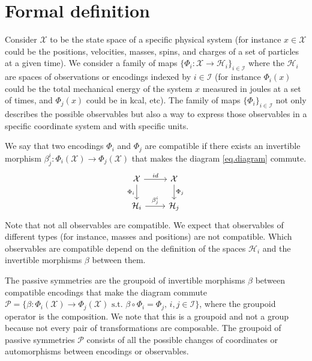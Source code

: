 \documentclass{article}
\theoremstyle{plain}
\theoremstyle{definition}
\theoremstyle{remark}
\begin{document}
\section{Formal definition}\label{sec:definitions}

Consider $\mathcal X$ to be the state space of a specific physical system (for instance $x\in \mathcal X$ could be the positions, velocities, masses, spins, and charges of a set of particles at a given time). 
We consider a family of maps $\{\Phi_i: \mathcal X \to \mathcal H_i\}_{i\in \mathcal I}$ where the $\mathcal H_i$ are spaces of observations or encodings indexed by $i\in \mathcal I$ (for instance $\Phi_i(x)$ could be the total mechanical energy of the system $x$ measured in joules at a set of times, and $\Phi_j(x)$ could be in kcal, etc).
The family of maps $\{\Phi_i\}_{i\in \mathcal I}$ not only describes the possible observables but also a way to express those observables in a specific coordinate system and with specific units. 

We say that two encodings $\Phi_i$ and $\Phi_j$ are compatible if there exists an invertible morphism $\beta_{j}^i:\Phi_i(\mathcal X)\to  \Phi_j(\mathcal X)$ that makes the diagram \eqref{eq.diagram} commute.
\begin{equation}\label{eq.diagram}
\begin{tikzcd}[]
  {\cal X}\arrow[r,"id"] \arrow[d,"\Phi_i",swap] & {\cal X}  \arrow[d,"\Phi_j"]\\
{\mathcal H_i} \arrow[r,"\beta_{j}^i"]  & {\mathcal H_j} 
\end{tikzcd}
\end{equation}
Note that not all observables are compatible. We expect that observables of different types (for instance, masses and positions) are not compatible. Which observables are compatible depend on the definition of the spaces $\mathcal H_i$ and the invertible morphisms $\beta$ between them.


The passive symmetries are the groupoid of invertible morphisms $\beta$ between compatible encodings that make the diagram commute $\mathcal P = \{\beta: \Phi_i(\mathcal X) \to \Phi_j(\mathcal X) \text{ s.t. } \beta\circ \Phi_i = \Phi_j, \, i,j\in \mathcal I \}$, where the groupoid operator is the composition. We note that this is a groupoid and not a group because not every pair of transformations are composable. 
The groupoid of passive symmetries $\mathcal P$ consists of all the possible changes of coordinates or automorphisms between encodings or observables. 
\end{document}
